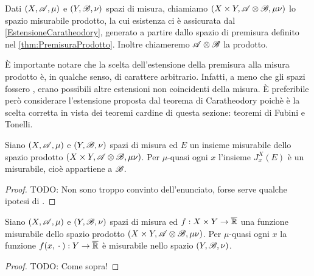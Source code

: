 \begin{definition}
	Dati $(X,\mathscr A,\mu)$ e $(Y,\mathscr B,\nu)$ spazi di misura, chiamiamo $(X\times Y,\mathscr A\otimes\mathscr B,\mu\nu)$ lo spazio misurabile prodotto, la cui esistenza ci è assicurata dal \cref{EstensioneCaratheodory}, generato a partire dallo spazio di premisura definito nel \cref{thm:PremisuraProdotto}. Inoltre chiameremo $\mathscr A\otimes\mathscr B$ la \sigalg{} prodotto.
\end{definition}

È importante notare che la scelta dell'estensione della premisura alla misura prodotto è, in qualche senso, di carattere arbitrario. Infatti, a meno che gli spazi fossero \sigfin[i], erano possibili altre estensioni non coincidenti della misura. 
È preferibile però considerare l'estensione proposta dal teorema di Caratheodory poichè è la scelta corretta in vista dei teoremi cardine di questa sezione: teoremi di Fubini e Tonelli.

\begin{proposition}
	Siano $(X,\mathscr A,\mu)$ e $(Y,\mathscr B,\nu)$ spazi di misura ed $E$ un insieme misurabile dello spazio prodotto $(X\times Y,\mathscr A\otimes\mathscr B,\mu\nu)$.
	Per $\mu$-quasi ogni $x$ l'insieme $J^X_x(E)$ è un misurabile, cioè appartiene a $\mathscr B$.
\end{proposition}
\begin{proof}
	TODO: Non sono troppo convinto dell'enunciato, forse serve qualche ipotesi di \sigfin[ezza].
\end{proof}

\begin{proposition}
	Siano $(X,\mathscr A,\mu)$ e $(Y,\mathscr B,\nu)$ spazi di misura ed $f:X\times Y\to\overline{\mathbb R}$ una funzione misurabile dello spazio prodotto $(X\times Y,\mathscr A\otimes\mathscr B,\mu\nu)$.
	Per $\mu$-quasi ogni $x$ la funzione $f(x,{}\cdot{}):Y\to\overline{\mathbb R}$ è misurabile nello spazio $(Y,\mathscr B,\nu)$.
\end{proposition}
\begin{proof}
	TODO: Come sopra!
\end{proof}





